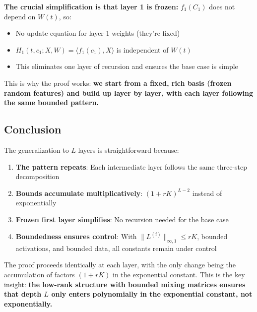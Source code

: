 \textbf{The crucial simplification is that layer 1 is frozen:} $f_1(C_1)$ does not depend on $W(t)$, so:
\begin{itemize}
\item No update equation for layer 1 weights (they're fixed)
\item $H_1(t, c_1; X, W) = \langle f_1(c_1), X\rangle$ is independent of $W(t)$
\item This eliminates one layer of recursion and ensures the base case is simple
\end{itemize}

This is why the proof works: \textbf{we start from a fixed, rich basis (frozen random features) and build up layer by layer, with each layer following the same bounded pattern.}

\subsection{Conclusion}

The generalization to $L$ layers is straightforward because:
\begin{enumerate}
\item \textbf{The pattern repeats}: Each intermediate layer follows the same three-step decomposition
\item \textbf{Bounds accumulate multiplicatively}: $(1+rK)^{L-2}$ instead of exponentially
\item \textbf{Frozen first layer simplifies}: No recursion needed for the base case
\item \textbf{Boundedness ensures control}: With $\|L^{(i)}\|_{\infty,1} \le rK$, bounded activations, and bounded data, all constants remain under control
\end{enumerate}

The proof proceeds identically at each layer, with the only change being the accumulation of factors $(1+rK)$ in the exponential constant. This is the key insight: \textbf{the low-rank structure with bounded mixing matrices ensures that depth $L$ only enters polynomially in the exponential constant, not exponentially.}
